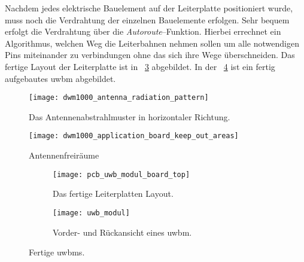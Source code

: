 Nachdem jedes elektrische Bauelement auf der Leiterplatte positioniert wurde, muss noch die Verdrahtung der einzelnen Bauelemente erfolgen. Sehr bequem erfolgt die Verdrahtung über die \textit{Autoroute}--Funktion. Hierbei errechnet ein Algorithmus, welchen Weg die Leiterbahnen nehmen sollen um alle notwendigen Pins miteinander zu verbindungen ohne das sich ihre Wege überschneiden. Das fertige Layout der Leiterplatte ist in \figurename~\ref{fig:pcb_uwb_modul_board_top} abgebildet. In der \figurename~\ref{fig:uwb_modul} ist ein fertig aufgebautes \gls{uwbm} abgebildet.

\begin{figure}
	\centering
	\texttt{[image: dwm1000\_antenna\_radiation\_pattern]}
	\caption{Das Antennenabstrahlmuster in horizontaler Richtung.}
	\label{fig:dwm1000_antenna_radiation_pattern}
\end{figure}
	
\begin{figure}
	\centering
	\texttt{[image: dwm1000\_application\_board\_keep\_out\_areas]}
	\caption{Antennenfreiräume}
	\label{fig:dwm1000_application_board_keep_out_areas}
\end{figure}

%

\begin{figure}
	\begin{subfigure}[t]{0.3\textwidth}
		\texttt{[image: pcb\_uwb\_modul\_board\_top]}
		\caption{Das fertige Leiterplatten Layout.}
		\label{fig:pcb_uwb_modul_board_top}
	\end{subfigure}
	\hfill
	\begin{subfigure}[t]{0.6\textwidth}
		\centering
		\texttt{[image: uwb\_modul]}
		\caption{Vorder- und Rückansicht eines \gls{uwbm}.}
		\label{fig:uwb_modul}
	\end{subfigure}
	\caption{Fertige \glspl{uwbm}.}
	\label{fig:fertige_uwb_module}
\end{figure}


